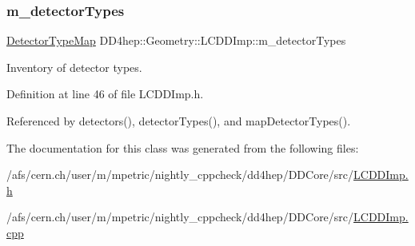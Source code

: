 \subsubsection{\texorpdfstring{m\+\_\+detector\+Types}{m\_detectorTypes}}
{\footnotesize\ttfamily \hyperlink{class_d_d4hep_1_1_geometry_1_1_l_c_d_d_imp_af80f7fef6780569e2368b4c65bba3f58}{Detector\+Type\+Map} D\+D4hep\+::\+Geometry\+::\+L\+C\+D\+D\+Imp\+::m\+\_\+detector\+Types\hspace{0.3cm}{\ttfamily [protected]}}



Inventory of detector types. 



Definition at line 46 of file L\+C\+D\+D\+Imp.\+h.



Referenced by detectors(), detector\+Types(), and map\+Detector\+Types().



The documentation for this class was generated from the following files\+:\begin{DoxyCompactItemize}
\item 
/afs/cern.\+ch/user/m/mpetric/nightly\+\_\+cppcheck/dd4hep/\+D\+D\+Core/src/\hyperlink{_l_c_d_d_imp_8h}{L\+C\+D\+D\+Imp.\+h}\item 
/afs/cern.\+ch/user/m/mpetric/nightly\+\_\+cppcheck/dd4hep/\+D\+D\+Core/src/\hyperlink{_l_c_d_d_imp_8cpp}{L\+C\+D\+D\+Imp.\+cpp}\end{DoxyCompactItemize}
